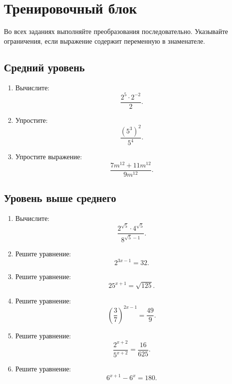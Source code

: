 \documentclass[a4paper,12pt]{article}
\newcommand{\sectionline}{%
    \par\noindent{\color{accent}\rule{\linewidth}{0.7pt}}\par
}
\begin{document}
\clearpage




\clearpage


\section*{\color{darkaccent}Тренировочный блок}
\sectionline

Во всех заданиях выполняйте преобразования последовательно. Указывайте
ограничения, если выражение содержит переменную в знаменателе.

\subsection*{\color{darkaccent}Средний уровень}

\begin{enumerate}
    \item Вычислите:
    \[
    \frac{2^5\cdot2^{-2}}{2}.
    \]

    \item Упростите:
    \[
    \frac{(5^3)^2}{5^4}.
    \]

    \item Упростите выражение:
    \[
    \frac{7m^{12}+11m^{12}}{9m^{12}}.
    \]
\end{enumerate}

\subsection*{\color{darkaccent}Уровень выше среднего}

\begin{enumerate}[resume]
    \item Вычислите:
    \[
    \frac{2^{\sqrt5}\cdot4^{\sqrt5}}
         {8^{\sqrt5-1}}.
    \]

    \item Решите уравнение:
    \[
    2^{3x-1}=32.
    \]

    \item Решите уравнение:
    \[
    25^{x+1}=\sqrt{125}.
    \]

    \item Решите уравнение:
    \[
    \left(\frac37\right)^{2x-1}=\frac{49}{9}.
    \]

    \item Решите уравнение:
    \[
    \frac{2^{x+2}}{5^{x+2}}=\frac{16}{625}.
    \]

    \item Решите уравнение:
    \[
    6^{x+1}-6^x=180.
    \]
\end{enumerate}
\end{document}
